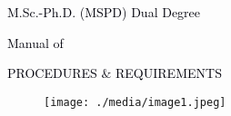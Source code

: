 \documentclass[12pt]{article}
\begin{document}
\vspace{\baselineskip}
\begin{Center}
{\fontsize{20pt}{24.0pt}\selectfont \textcolor[HTML]{00000A}{M.Sc.-Ph.D. (MSPD) Dual Degree}\par}
\end{Center}\par


\vspace{\baselineskip}

\vspace{\baselineskip}

\vspace{\baselineskip}

\vspace{\baselineskip}
\begin{Center}
{\fontsize{20pt}{24.0pt}\selectfont \textcolor[HTML]{00000A}{Manual of}\par}
\end{Center}\par


\vspace{\baselineskip}
\begin{Center}
{\fontsize{22pt}{26.4pt}\selectfont \textcolor[HTML]{00000A}{PROCEDURES $\&$  REQUIREMENTS}\par}
\end{Center}\par




\begin{figure}[H]
\advance\leftskip 2.19in		\texttt{[image: ./media/image1.jpeg]}
\end{figure}



\par


\vspace{\baselineskip}

\vspace{\baselineskip}

\vspace{\baselineskip}

\vspace{\baselineskip}

\vspace{\baselineskip}

\vspace{\baselineskip}
\end{document}
